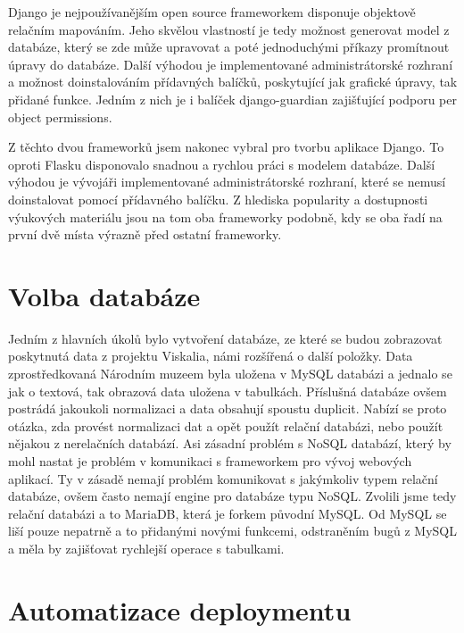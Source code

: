 Django je nejpoužívanějším open source frameworkem disponuje objektově relačním mapováním. Jeho skvělou vlastností je tedy možnost generovat model z databáze, který se zde může upravovat a poté jednoduchými příkazy promítnout úpravy do databáze. Další výhodou je implementované administrátorské rozhraní a možnost doinstalováním přídavných balíčků, poskytující jak grafické úpravy, tak přidané funkce. Jedním z nich je i balíček django-guardian zajišťující podporu per object permissions.

Z těchto dvou frameworků jsem nakonec vybral pro tvorbu aplikace Django. To oproti Flasku disponovalo snadnou a rychlou práci s modelem databáze. Další výhodou je vývojáři implementované administrátorské rozhraní, které se nemusí doinstalovat pomocí přídavného balíčku. Z hlediska popularity a dostupnosti výukových materiálu jsou na tom oba frameworky podobně, kdy se oba řadí na první dvě místa výrazně před ostatní frameworky. 

\vspace{10px}

\section{Volba databáze}

Jedním z hlavních úkolů bylo vytvoření databáze, ze které se budou zobrazovat poskytnutá data z projektu Viskalia, námi rozšířená o další položky. Data zprostředkovaná Národním muzeem byla uložena v MySQL databázi a jednalo se jak o textová, tak obrazová data uložena v tabulkách. Příslušná databáze ovšem postrádá jakoukoli normalizaci a data obsahují spoustu duplicit. Nabízí se proto otázka, zda provést normalizaci dat a opět použít relační databázi, nebo použít nějakou z nerelačních databází. Asi zásadní problém s NoSQL databází, který by mohl nastat je problém v komunikaci s frameworkem pro vývoj webových aplikací. Ty v zásadě nemají problém komunikovat s jakýmkoliv typem relační databáze, ovšem často nemají engine pro databáze typu NoSQL. Zvolili jsme tedy relační databázi a to MariaDB, která je forkem původní MySQL. Od MySQL se liší pouze nepatrně a to přidanými novými funkcemi, odstraněním bugů z MySQL a měla by zajišťovat rychlejší operace s tabulkami.

\section{Automatizace deploymentu}

